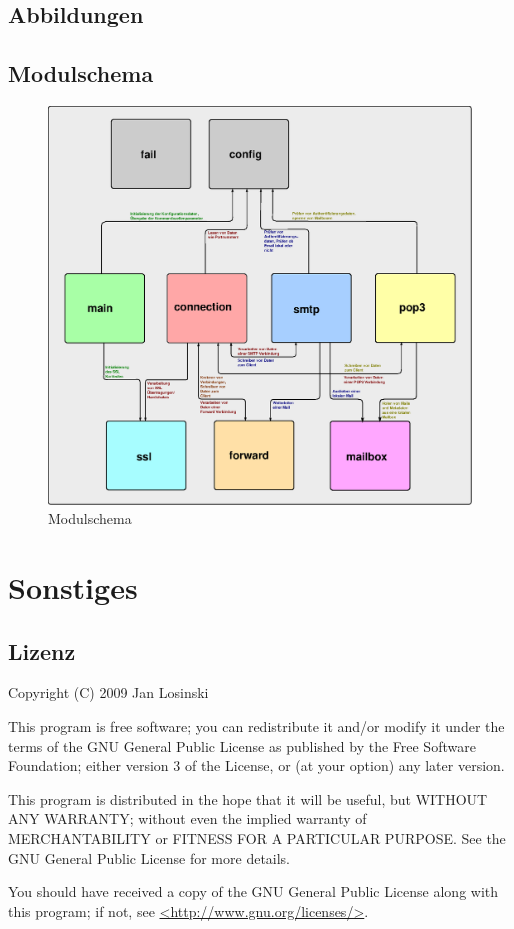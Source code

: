 \documentclass[final,a4paper,11pt,notitlepage,halfparskip]{scrreprt}
\begin{document}
\begin{appendix}
  \chapter{Abbildungen}
  \section{Modulschema}
  \begin{figure}[htb]
    \includegraphics[width=\textwidth]{schema.eps}
    \caption{Modulschema}
    \label{fig:schema}
  \end{figure}
\end{appendix}
\chapter{Sonstiges}
\section{Lizenz}
Copyright (C) 2009 Jan Losinski

This program is free software; you can redistribute it and/or modify it under
the terms of the GNU General Public License as published by the Free Software 
Foundation; either version 3 of the License, or (at your option) any later 
version.

This program is distributed in the hope that it will be useful, but WITHOUT ANY 
WARRANTY; without even the implied warranty of MERCHANTABILITY or FITNESS FOR A 
PARTICULAR PURPOSE. See the GNU General Public License for more details.

You should have received a copy of the GNU General Public License along with 
this program; if not, see \url{<http://www.gnu.org/licenses/>}.
\end{document}
